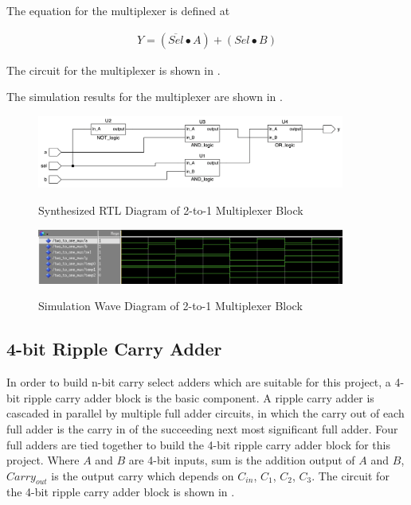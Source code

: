 \noindent The equation for the multiplexer is defined at 

\begin{equation}
	\begin{array}{c}
		Y=(\overline{Sel} \bullet  A )+( Sel\bullet B )
	\end{array}
	\label{exp:mx_exp}
\end{equation}

\noindent The circuit for the multiplexer is shown in .

\noindent The simulation results for the multiplexer are shown in .

\begin{figure}[!htp]
	\centering
	\caption{Synthesized RTL Diagram of 2-to-1 Multiplexer Block}
	\includegraphics[width=0.9\textwidth]{../img/mx_rtl.png}
	\label{fig:mx_rtl}
\end{figure}


\begin{figure}[!htp]
	\centering
	\caption{Simulation Wave Diagram of 2-to-1 Multiplexer Block}
	\includegraphics[width=0.9\textwidth]{../img/mx_sim.png}
	\label{fig:mx_sim}
\end{figure}

\subsection{4-bit Ripple Carry Adder}

In order to build n-bit carry select adders which are suitable for this project,
a 4-bit ripple carry adder block is the basic component.
A ripple carry adder is cascaded in parallel by multiple full adder circuits,
in which the carry out of each full adder is the carry in of the succeeding next most significant full adder.
Four full adders are tied together to build the 4-bit ripple carry adder block for this project.
Where \(A\) and \(B\) are 4-bit inputs, sum is the addition output of \(A\) and \(B\), \(Carry_{out}\) is the output carry which depends on \(C_{in}\), \(C_1\), \(C_2\), \(C_3\).
The circuit for the 4-bit ripple carry adder block is shown in .

